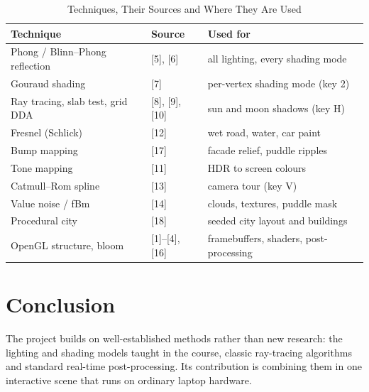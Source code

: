 \documentclass[12pt, a4paper]{report}
\begin{document}
\begin{table}[!htbp]
  \caption{Techniques, Their Sources and Where They Are Used}
  \label{tab:2.2}
  \centering
  {\fontsize{10}{12.5}\selectfont
    \begin{tabular}{|p{1.8in}|p{1.3in}|p{2.3in}|}
      \hline
      \textbf{Technique} & \textbf{Source} & \textbf{Used for} \\
      \hline
      Phong / Blinn--Phong reflection & [5], [6] & all lighting, every shading mode \\
      \hline
      Gouraud shading & [7] & per-vertex shading mode (key 2) \\
      \hline
      Ray tracing, slab test, grid DDA & [8], [9], [10] & sun and moon shadows (key H) \\
      \hline
      Fresnel (Schlick) & [12] & wet road, water, car paint \\
      \hline
      Bump mapping & [17] & facade relief, puddle ripples \\
      \hline
      Tone mapping & [11] & HDR to screen colours \\
      \hline
      Catmull--Rom spline & [13] & camera tour (key V) \\
      \hline
      Value noise / fBm & [14] & clouds, textures, puddle mask \\
      \hline
      Procedural city & [18] & seeded city layout and buildings \\
      \hline
      OpenGL structure, bloom & [1]--[4], [16] & framebuffers, shaders, post-processing \\
      \hline
    \end{tabular}
  }
\end{table}

\section{Conclusion}

\begin{justify}
  {\fontsize{12}{13.8}\selectfont
    The project builds on well-established methods rather than new research: the lighting and shading models taught in the course, classic ray-tracing algorithms and standard real-time post-processing. Its contribution is combining them in one interactive scene that runs on ordinary laptop hardware.
  }
\end{justify}

\end{document}
